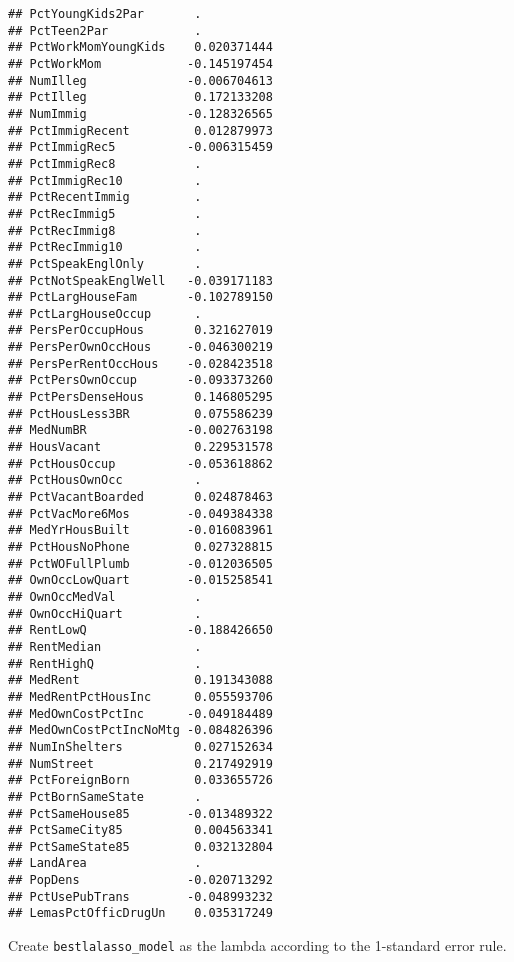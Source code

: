\documentclass[
]{article}
\newenvironment{Shaded}{\begin{snugshade}}{\end{snugshade}}
\newcommand{\NormalTok}[1]{#1}
\newcommand{\OtherTok}[1]{\textcolor[rgb]{0.56,0.35,0.01}{#1}}
\newcommand{\SpecialCharTok}[1]{\textcolor[rgb]{0.81,0.36,0.00}{\textbf{#1}}}
\begin{document}
\begin{verbatim}
## PctYoungKids2Par       .          
## PctTeen2Par            .          
## PctWorkMomYoungKids    0.020371444
## PctWorkMom            -0.145197454
## NumIlleg              -0.006704613
## PctIlleg               0.172133208
## NumImmig              -0.128326565
## PctImmigRecent         0.012879973
## PctImmigRec5          -0.006315459
## PctImmigRec8           .          
## PctImmigRec10          .          
## PctRecentImmig         .          
## PctRecImmig5           .          
## PctRecImmig8           .          
## PctRecImmig10          .          
## PctSpeakEnglOnly       .          
## PctNotSpeakEnglWell   -0.039171183
## PctLargHouseFam       -0.102789150
## PctLargHouseOccup      .          
## PersPerOccupHous       0.321627019
## PersPerOwnOccHous     -0.046300219
## PersPerRentOccHous    -0.028423518
## PctPersOwnOccup       -0.093373260
## PctPersDenseHous       0.146805295
## PctHousLess3BR         0.075586239
## MedNumBR              -0.002763198
## HousVacant             0.229531578
## PctHousOccup          -0.053618862
## PctHousOwnOcc          .          
## PctVacantBoarded       0.024878463
## PctVacMore6Mos        -0.049384338
## MedYrHousBuilt        -0.016083961
## PctHousNoPhone         0.027328815
## PctWOFullPlumb        -0.012036505
## OwnOccLowQuart        -0.015258541
## OwnOccMedVal           .          
## OwnOccHiQuart          .          
## RentLowQ              -0.188426650
## RentMedian             .          
## RentHighQ              .          
## MedRent                0.191343088
## MedRentPctHousInc      0.055593706
## MedOwnCostPctInc      -0.049184489
## MedOwnCostPctIncNoMtg -0.084826396
## NumInShelters          0.027152634
## NumStreet              0.217492919
## PctForeignBorn         0.033655726
## PctBornSameState       .          
## PctSameHouse85        -0.013489322
## PctSameCity85          0.004563341
## PctSameState85         0.032132804
## LandArea               .          
## PopDens               -0.020713292
## PctUsePubTrans        -0.048993232
## LemasPctOfficDrugUn    0.035317249
\end{verbatim}

\begin{Shaded}
\end{Shaded}

Create \texttt{bestlalasso\_model} as the lambda according to the
1-standard error rule.
\end{document}
